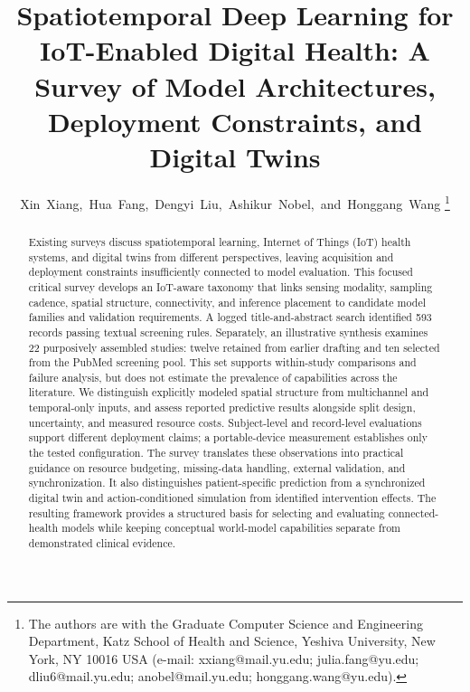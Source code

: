 \documentclass[journal]{IEEEtran}
\begin{document}
\title{Spatiotemporal Deep Learning for IoT-Enabled Digital Health: A Survey of Model Architectures, Deployment Constraints, and Digital Twins}

\author{Xin~Xiang,~Hua~Fang,~Dengyi~Liu,~Ashikur~Nobel,~and~Honggang~Wang%
\thanks{The authors are with the Graduate Computer Science and Engineering Department, Katz School of Health and Science, Yeshiva University, New York, NY 10016 USA (e-mail: xxiang@mail.yu.edu; julia.fang@yu.edu; dliu6@mail.yu.edu; anobel@mail.yu.edu; honggang.wang@yu.edu).}}

\maketitle

\begin{abstract}
Existing surveys discuss spatiotemporal learning, Internet of Things (IoT) health systems, and digital twins from different perspectives, leaving acquisition and deployment constraints insufficiently connected to model evaluation. This focused critical survey develops an IoT-aware taxonomy that links sensing modality, sampling cadence, spatial structure, connectivity, and inference placement to candidate model families and validation requirements. A logged title-and-abstract search identified 593 records passing textual screening rules. Separately, an illustrative synthesis examines 22 purposively assembled studies: twelve retained from earlier drafting and ten selected from the PubMed screening pool. This set supports within-study comparisons and failure analysis, but does not estimate the prevalence of capabilities across the literature. We distinguish explicitly modeled spatial structure from multichannel and temporal-only inputs, and assess reported predictive results alongside split design, uncertainty, and measured resource costs. Subject-level and record-level evaluations support different deployment claims; a portable-device measurement establishes only the tested configuration. The survey translates these observations into practical guidance on resource budgeting, missing-data handling, external validation, and synchronization. It also distinguishes patient-specific prediction from a synchronized digital twin and action-conditioned simulation from identified intervention effects. The resulting framework provides a structured basis for selecting and evaluating connected-health models while keeping conceptual world-model capabilities separate from demonstrated clinical evidence.
\end{abstract}
\end{document}

